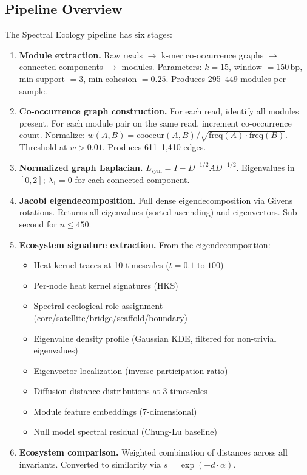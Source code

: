 \documentclass{../yalumba}
\begin{document}
\subsection{Pipeline Overview}

The Spectral Ecology pipeline has six stages:

\begin{enumerate}
  \item \textbf{Module extraction.}  Raw reads $\to$ k-mer co-occurrence
    graphs $\to$ connected components $\to$ modules.  Parameters: $k = 15$,
    window $= 150$\,bp, min support $= 3$, min cohesion $= 0.25$.
    Produces 295--449 modules per sample.
  \item \textbf{Co-occurrence graph construction.}  For each read, identify
    all modules present.  For each module pair on the same read, increment
    co-occurrence count.  Normalize:
    $w(A,B) = \text{cooccur}(A,B) / \sqrt{\text{freq}(A) \cdot \text{freq}(B)}$.
    Threshold at $w > 0.01$.  Produces 611--1{,}410 edges.
  \item \textbf{Normalized graph Laplacian.}
    $L_{\text{sym}} = I - D^{-1/2} A D^{-1/2}$.
    Eigenvalues in $[0, 2]$; $\lambda_1 = 0$ for each connected component.
  \item \textbf{Jacobi eigendecomposition.}  Full dense eigendecomposition via
    Givens rotations.  Returns all eigenvalues (sorted ascending) and
    eigenvectors.  Sub-second for $n \leq 450$.
  \item \textbf{Ecosystem signature extraction.}  From the eigendecomposition:
    \begin{itemize}
      \item Heat kernel traces at 10 timescales ($t = 0.1$ to $100$)
      \item Per-node heat kernel signatures (HKS)
      \item Spectral ecological role assignment (core/satellite/bridge/scaffold/boundary)
      \item Eigenvalue density profile (Gaussian KDE, filtered for non-trivial eigenvalues)
      \item Eigenvector localization (inverse participation ratio)
      \item Diffusion distance distributions at 3 timescales
      \item Module feature embeddings (7-dimensional)
      \item Null model spectral residual (Chung-Lu baseline)
    \end{itemize}
  \item \textbf{Ecosystem comparison.}  Weighted combination of distances
    across all invariants.  Converted to similarity via
    $s = \exp(-d \cdot \alpha)$.
\end{enumerate}
\end{document}
